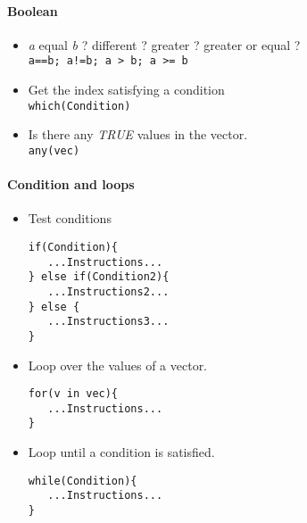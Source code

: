 \documentclass[12pt]{article}
\begin{document}
\newpage


\paragraph{Boolean} 
\begin{itemize} 
  \item {\it a} equal {\it b} ? different ? greater ? greater or equal ? \\ 
    \verb?a==b; a!=b; a > b; a >= b?
  \item Get the index satisfying a condition \\ 
    \verb?which(Condition)?
  \item Is there any {\it TRUE} values in the vector. \\ 
    \verb?any(vec)?
\end{itemize}



\paragraph{Condition and loops}
\begin{itemize} 
  \item Test conditions
\begin{verbatim}
if(Condition){
   ...Instructions...
} else if(Condition2){
   ...Instructions2...
} else {
   ...Instructions3...
}
\end{verbatim}
  \item Loop over the values of a vector.
\begin{verbatim}
for(v in vec){
   ...Instructions...
} 
\end{verbatim}
  \item Loop until a condition is satisfied.
\begin{verbatim}
while(Condition){
   ...Instructions...
}
\end{verbatim}
\end{itemize}


\newpage
\end{document}
